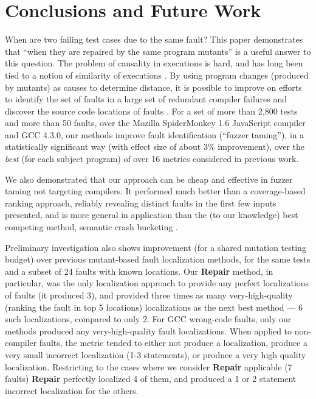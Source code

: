 \section{Conclusions and Future Work}
\label{conc}
When are two failing test cases due to the same fault?  This paper
demonstrates that
``when they are repaired by the same program mutants'' is a useful answer to
this question.  The problem of causality in executions is hard, and
has long been tied to a notion of similarity of
executions \cite{NearNeighbor,GroceError}.  By using program changes
(produced by mutants) as
causes to determine distance, it is possible to improve on efforts
to identify the set of faults in a large set of redundant compiler failures
\cite{PLDI13} and discover the source code locations of faults
\cite{MUSE,multilingual}.  For a set of more than 2,800 tests and more
than 50 faults, over the Mozilla SpiderMonkey 1.6 JavaScript compiler and
GCC 4.3.0, our methods improve fault identification (``fuzzer taming''), in a statistically significant way
(with effect size of about 3\% improvement), over
the \emph{best} (for each subject program) of over 16 metrics
considered in previous work.

We also demonstrated that our approach can be cheap and effective in
fuzzer taming not targeting compilers.  It performed much better than
a coverage-based ranking approach, reliably revealing distinct faults
in the first few inputs presented, and is more general in application
than the (to our knowledge) best competing method, semantic crash
bucketing \cite{SCB}.

Preliminary investigation also shows improvement (for a shared
mutation testing budget) over previous mutant-based fault localization
methods, for the same tests and a subset of 24 faults with known
locations.  Our {\bf Repair} method, in particular, was the only
localization approach to provide any perfect localizations of faults
(it produced 3),
and provided three times as many very-high-quality (ranking the fault
in top 5 locations) localizations as the next best method
\cite{multilingual}  --- 6 such localizations, compared to only 2.
For GCC wrong-code faults, only our methods produced any
very-high-quality fault localizations.  When applied to non-compiler
faults, the metric tended to either not produce a localization,
produce a very small incorrect localization (1-3 statements), or
produce a very high quality localization.  Restricting to the cases
where we consider {\bf Repair} applicable (7 faults) {\bf Repair}
perfectly localized 4 of them, and produced a 1 or 2 statement
incorrect localization for the others.  

